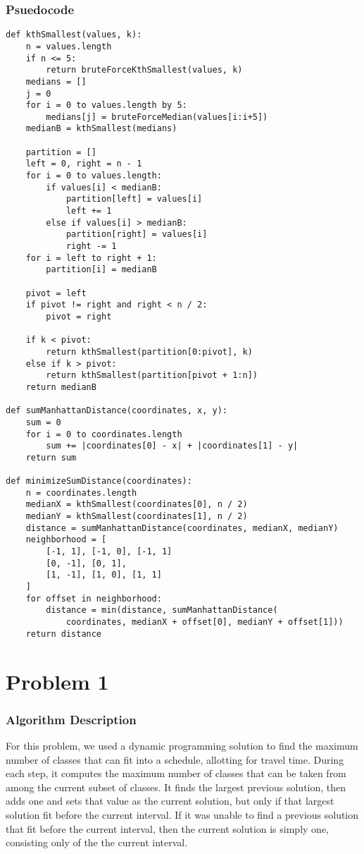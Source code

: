 \documentclass{math}
\begin{document}
\subsubsection*{Psuedocode}
\begin{lstlisting}
def kthSmallest(values, k):
    n = values.length
    if n <= 5:
        return bruteForceKthSmallest(values, k)
    medians = []
    j = 0
    for i = 0 to values.length by 5:
        medians[j] = bruteForceMedian(values[i:i+5])
    medianB = kthSmallest(medians)

    partition = []
    left = 0, right = n - 1
    for i = 0 to values.length:
        if values[i] < medianB:
            partition[left] = values[i]
            left += 1
        else if values[i] > medianB:
            partition[right] = values[i]
            right -= 1
    for i = left to right + 1:
        partition[i] = medianB

    pivot = left
    if pivot != right and right < n / 2:
        pivot = right

    if k < pivot:
        return kthSmallest(partition[0:pivot], k)
    else if k > pivot:
        return kthSmallest(partition[pivot + 1:n])
    return medianB

def sumManhattanDistance(coordinates, x, y):
    sum = 0
    for i = 0 to coordinates.length
        sum += |coordinates[0] - x| + |coordinates[1] - y|
    return sum

def minimizeSumDistance(coordinates):
    n = coordinates.length
    medianX = kthSmallest(coordinates[0], n / 2)
    medianY = kthSmallest(coordinates[1], n / 2)
    distance = sumManhattanDistance(coordinates, medianX, medianY)
    neighborhood = [
        [-1, 1], [-1, 0], [-1, 1]
        [0, -1], [0, 1],
        [1, -1], [1, 0], [1, 1]
    ]
    for offset in neighborhood:
        distance = min(distance, sumManhattanDistance(
            coordinates, medianX + offset[0], medianY + offset[1]))
    return distance
\end{lstlisting}

\section*{Problem 1}

\subsubsection*{Algorithm Description}
For this problem, we used a dynamic programming solution to find the maximum
number of classes that can fit into a schedule, allotting for travel time.
During each step, it computes the maximum number of classes that can be taken
from among the current subset of classes. It finds the largest previous
solution, then adds one and sets that value as the current solution, but only
if that largest solution fit before the current interval. If it was unable to
find a previous solution that fit before the current interval, then the current
solution is simply one, consisting only of the the current interval.
\end{document}
